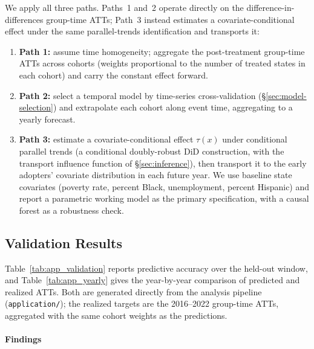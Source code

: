 \documentclass{article}
\begin{document}
We apply all three paths. Paths~1 and~2 operate directly on the difference-in-differences group-time ATTs; Path~3 instead estimates a covariate-conditional effect under the same parallel-trends identification and transports it:
\begin{enumerate}
\item \textbf{Path 1:} assume time homogeneity; aggregate the post-treatment group-time ATTs across cohorts (weights proportional to the number of treated states in each cohort) and carry the constant effect forward.
\item \textbf{Path 2:} select a temporal model by time-series cross-validation (\S\ref{sec:model-selection}) and extrapolate each cohort along event time, aggregating to a yearly forecast.
\item \textbf{Path 3:} estimate a covariate-conditional effect $\tau(x)$ under conditional parallel trends (a conditional doubly-robust DiD construction, with the transport influence function of \S\ref{sec:inference}), then transport it to the early adopters' covariate distribution in each future year. We use baseline state covariates (poverty rate, percent Black, unemployment, percent Hispanic) and report a parametric working model as the primary specification, with a causal forest as a robustness check.
\end{enumerate}

\subsection{Validation Results}


Table~\ref{tab:app_validation} reports predictive accuracy over the held-out window, and Table~\ref{tab:app_yearly} gives the year-by-year comparison of predicted and realized ATTs. Both are generated directly from the analysis pipeline (\texttt{application/}); the realized targets are the 2016--2022 group-time ATTs, aggregated with the same cohort weights as the predictions.





\paragraph{Findings}
\end{document}
